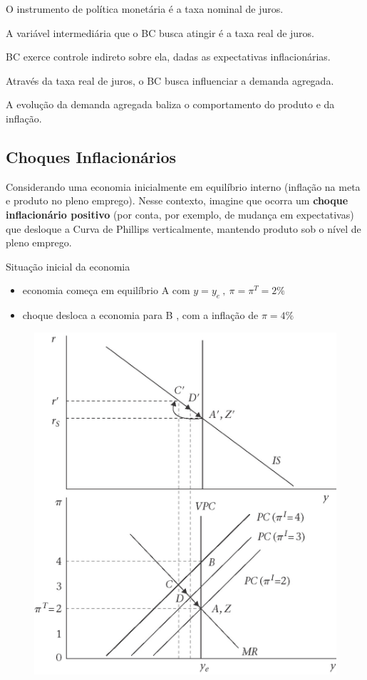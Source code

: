 \documentclass[a4paper,12pt]{article}[abntex2]
\begin{document}
O instrumento de política monetária é a taxa nominal de juros.

A variável intermediária que o BC busca atingir é a taxa real de juros.

BC exerce controle indireto sobre ela, dadas as expectativas inflacionárias.

Através da taxa real de juros, o BC busca influenciar a demanda agregada.

A evolução da demanda agregada baliza o comportamento do produto e da inflação.

\subsection{\textbf{Choques Inflacionários}}
Considerando uma economia inicialmente em equilíbrio interno (inflação na meta e produto no pleno emprego). Nesse contexto, imagine que ocorra um \textbf{choque inflacionário positivo} (por conta,  por  exemplo,  de  mudança  em  expectativas)  que  desloque  a  Curva  de  Phillips verticalmente, mantendo produto sob o nível de pleno emprego. 

Situação inicial da economia \begin{itemize}
    \item economia começa em equilíbrio A com \(y=y_e \ , \ \pi=\pi^T=2\%\)
    \item choque desloca a economia para B , com a inflação de \(\pi = 4\%\)
\end{itemize}

\begin{figure}[H]
    \centering
    \includegraphics[width=0.7\linewidth]{Imagens/a13i1.png}
\end{figure}
\end{document}
